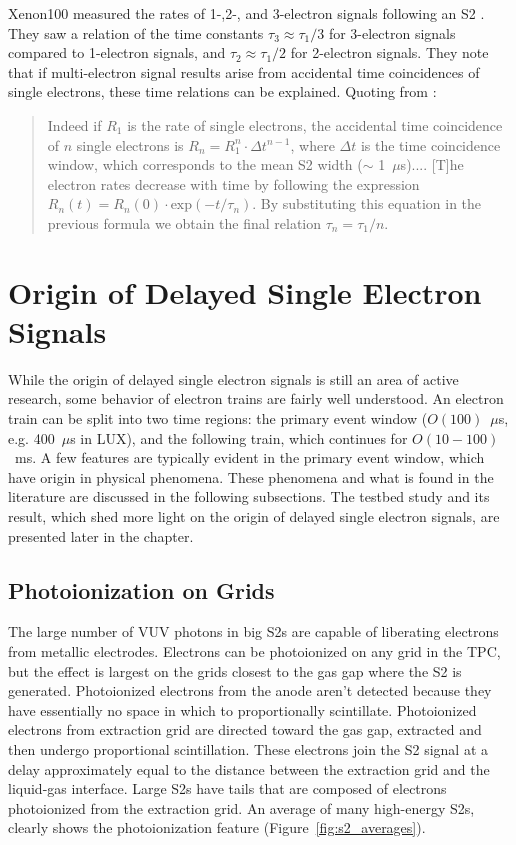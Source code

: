 Xenon100 measured the rates of 1-,2-, and 3-electron signals following an S2 \cite{Aprile2014}. They saw a relation of the time constants $\tau_{3} \approx \tau_{1}/3$ for 3-electron signals compared to 1-electron signals, and $\tau_{2} \approx \tau_{1}/2$ for 2-electron signals. They note that if multi-electron signal results arise from accidental time coincidences of single electrons, these time relations can be explained. Quoting from \cite{Aprile2014} :

\begin{quote}
Indeed if $R_{1}$ is the rate of single electrons, the accidental time coincidence of $n$ single electrons is $R_{n} = R_{1}^{n}\cdot \Delta t^{n-1}$, where $\Delta t$ is the time coincidence window, which
corresponds to the mean S2 width ($\sim$ 1~$\mu$s).... [T]he electron rates decrease with time by following the expression $R_{n}(t) = R_{n}(0) \cdot \mathrm{exp}(- t /  \tau_{n})$. By substituting this equation in the previous formula we obtain the final relation $\tau_{n} =\tau_{1}/n$. 
\end{quote}

\section{Origin of Delayed Single Electron Signals}
While the origin of delayed single electron signals is still an area of active research, some behavior of electron trains are fairly well understood. An electron train can be split into two time regions: the primary event window ($O(100)$~$\mu$s, e.g. 400~$\mu$s in \ac{LUX}), and the following train, which continues for $O(10-100)$~ms. A few features are typically evident in the primary event window, which have origin in physical phenomena. These phenomena and what is found in the literature are discussed in the following subsections. The testbed study and its result, which shed more light on the origin of delayed single electron signals, are presented later in the chapter. 

\subsection{Photoionization on Grids} 
The large number of \ac{VUV} photons in big S2s are capable of liberating electrons from metallic electrodes. Electrons can be photoionized on any grid in the \ac{TPC}, but the effect is largest on the grids closest to the gas gap where the S2 is generated. Photoionized electrons from the anode aren't detected because they have essentially no space in which to proportionally scintillate. Photoionized electrons from extraction grid are directed toward the gas gap, extracted and then undergo proportional scintillation. These electrons join the S2 signal at a delay approximately equal to the distance between the extraction grid and the liquid-gas interface. Large S2s have tails that are composed of electrons photoionized from the extraction grid. An average of many high-energy S2s, clearly shows the photoionization feature (Figure~\ref{fig:s2_averages}). 

